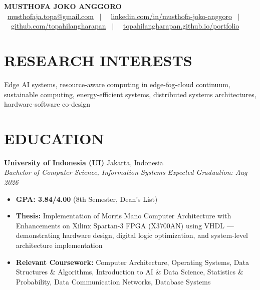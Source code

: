 \documentclass[10pt,a4paper]{article}
\newcommand{\contactline}[1]{\small #1}
\newcommand{\experienceheader}[4]{
    \textbf{#1} \hfill #2 \\
    \textit{#3} \hfill \textit{#4}
}
\begin{document}
\begin{center}
    {\LARGE \textbf{MUSTHOFA JOKO ANGGORO}} \\[4pt]
    \contactline{
        \faEnvelope\ \href{mailto:musthofaja.topa@gmail.com}{musthofaja.topa@gmail.com} \ $|$ \ 
        \faLinkedin\ \href{https://www.linkedin.com/in/musthofa-joko-anggoro/}{linkedin.com/in/musthofa-joko-anggoro} \ $|$ \
        \faGithub\ \href{https://github.com/topahilangharapan}{github.com/topahilangharapan} \ $|$ \
        \faGlobe\ \href{https://topahilangharapan.github.io/portfolio/}{topahilangharapan.github.io/portfolio}
    }
\end{center}

\vspace{-8pt}

\section*{RESEARCH INTERESTS}
Edge AI systems, resource-aware computing in edge-fog-cloud continuum, sustainable computing, energy-efficient systems, distributed systems architectures, hardware-software co-design

\section*{EDUCATION}

\experienceheader{University of Indonesia (UI)}{Jakarta, Indonesia}{Bachelor of Computer Science, Information Systems}{Expected Graduation: Aug 2026}
\begin{itemize}[leftmargin=*, itemsep=2pt, topsep=2pt]
    \item \textbf{GPA: 3.84/4.00} (8th Semester, Dean's List)
    \item \textbf{Thesis:} Implementation of Morris Mano Computer Architecture with Enhancements on Xilinx Spartan-3 FPGA (X3700AN) using VHDL — demonstrating hardware design, digital logic optimization, and system-level architecture implementation
    \item \textbf{Relevant Coursework:} Computer Architecture, Operating Systems, Data Structures \& Algorithms, Introduction to AI \& Data Science, Statistics \& Probability, Data Communication Networks, Database Systems
\end{itemize}

\vspace{4pt}
\end{document}
